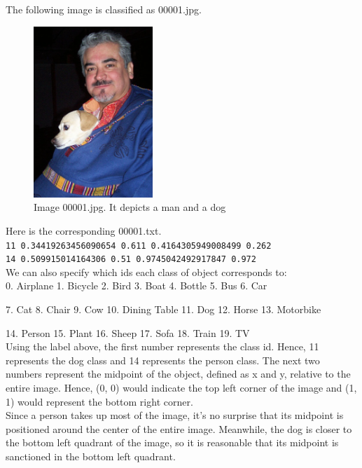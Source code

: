\documentclass{article}
\begin{document}
The following image is classified as 00001.jpg. \\

\begin{figure}[H]
  \centering
  \includegraphics[width=0.4\textwidth]{Images/man_dog.png}
  \caption{Image 00001.jpg. It depicts a man and a dog}
  \label{fig:example}
\end{figure}

Here is the corresponding 00001.txt. \\

\texttt{11 0.34419263456090654 0.611 0.4164305949008499 0.262 \\
14 0.509915014164306 0.51 0.9745042492917847 0.972} \\

We can also specify which ids each class of object corresponds to: \\

0. Airplane 	1. Bicycle 	2. Bird 	3. Boat 	4. Bottle 	5. Bus		6. Car

7. Cat 		8. Chair 	9. Cow 	10. Dining Table 	11. Dog 	12. Horse 	13. Motorbike 	

14. Person	15. Plant 	16. Sheep 	17. Sofa 	18. Train 	19. TV \\

Using the label above, the first number represents the class id. Hence, 11 represents the dog class and 14 represents the person class. The next two numbers represent the midpoint of the object, defined as x and y, relative to the entire image. Hence, (0, 0) would indicate the top left corner of the image and (1, 1) would represent the bottom right corner. \\

Since a person takes up most of the image, it's no surprise that its midpoint is positioned around the center of the entire image. Meanwhile, the dog is closer to the bottom left quadrant of the image, so it is reasonable that its midpoint is sanctioned in the bottom left quadrant. \\
\end{document}

